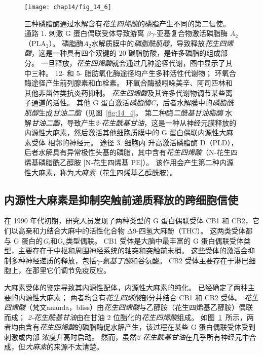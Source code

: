 \begin{figure}[htbp]
	\centering
	\texttt{[image: chap14/fig\_14\_6]}
	\caption{三种磷脂酶通过水解含有\textit{花生四烯酸}的磷脂产生不同的第二信使。
		通路 1. 刺激 G 蛋白偶联受体导致游离 $\beta \gamma$-亚基复合物激活磷脂酶 $A_2$（PLA$_2$）。
		磷脂酶$A_2$水解质膜中的\textit{磷脂酰肌醇}，导致释放\textit{花生四烯酸}，这是一种具有四个双键的 20 碳脂肪酸，是许多磷脂的组成部分。
		一旦释放，\textit{花生四烯酸}就会通过几种途径代谢，图中显示了其中三种。
		12- 和 5- 脂肪氧化酶途径均产生多种活性代谢物；
		环氧合酶途径产生前列腺素和血栓素。
		环氧合酶被吲哚美辛、阿司匹林和其他非甾体类抗炎药抑制。
		\textit{花生四烯酸}及其许多代谢物调节某些离子通道的活性。
		其他 G 蛋白激活\textit{磷脂酶C}，后者水解膜中的\textit{磷脂酰肌醇}生成\textit{甘油二酯}（见图~\ref{fig:14_4}。
		第二种酶\textit{二酰基甘油脂酶} 水解\textit{甘油二酯}，导致产生\textit{2-花生酰基甘油}，这是一种从神经元膜释放的内源性大麻素，然后激活其他细胞质膜中的 G 蛋白偶联内源性大麻素受体 相邻的神经元。
		途径 3. 细胞内  升高激活磷脂酶 D（PLD），后者水解具有异常极性头基的磷脂，其中含有\textit{花生四烯酸}（N-花生四烯基磷脂酰乙醇胺 [N-花生四烯基 PE]）。
		该作用会产生第二种内源性大麻素，称为\textit{大麻素}（花生四烯基乙醇酰胺）。}
	\label{fig:14_6}
\end{figure}



\subsection{内源性大麻素是抑制突触前递质释放的跨细胞信使}

在 1990 年代初期，研究人员发现了两种类型的 G 蛋白偶联受体 CB1 和 CB2，它们以高亲和力结合大麻中的活性化合物 Δ9-四氢大麻酚（THC）。
这两类受体都与 G 蛋白的\textit{G$_i $}和G$_o$类型偶联。
CB1 受体是大脑中最丰富的 G 蛋白偶联受体类型，主要存在于中枢和周围神经系统的轴突和突触前末梢。
这些受体的激活会抑制多种神经递质的释放，包括\textit{$\gamma$-氨基丁酸}和谷氨酸。
CB2 受体主要存在于淋巴细胞上，在那里它们调节免疫反应。


大麻素受体的鉴定导致其内源性配体，内源性大麻素的纯化。
已经确定了两种主要的内源性大麻素；
两者均含有\textit{花生四烯酸}部分并结合 CB1 和 CB2 受体。 
\textit{花生四烯酸}（梵文ananda，bliss）由\textit{花生四烯酸}与乙醇胺（花生四烯基乙醇胺）偶联而成；
\textit{2-花生酰基甘油}由在甘油 2 位酯化的\textit{花生四烯酸}组成。
如图~\ref{fig:14_6}~所示，两者均由含有\textit{花生四烯酸}的磷脂酶促水解产生，该过程在某些 G 蛋白偶联受体受到刺激或内部  浓度升高时启动。
然而，虽然\textit{2-花生酰基甘油}在几乎所有神经元中合成，但\textit{大麻素}的来源不太清楚。


